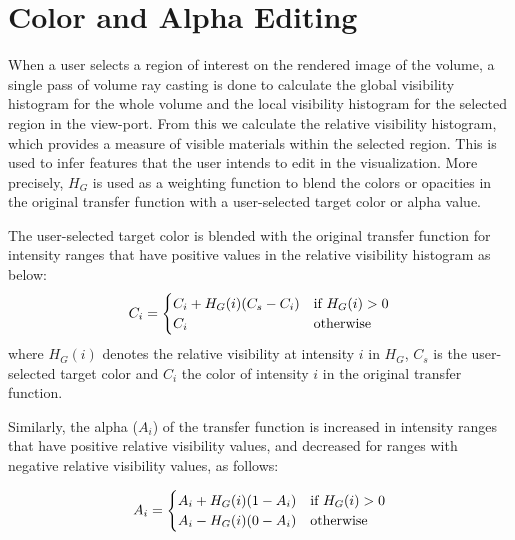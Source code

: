 \documentclass[twoside,twocolumn,10pt]{article}
\begin{document}


\section{Color and Alpha Editing} \label{color_and_alpha_editing}

When a user selects a region of interest on the rendered image of the volume, a single pass of volume ray casting is done to calculate the global visibility histogram for the whole volume and the local visibility histogram for the selected region in the view-port. From this we calculate the relative visibility histogram, which provides a measure of visible materials within the selected region. This is used to infer features that the user intends to edit in the visualization. More precisely, $H_G$ is used as a weighting function to blend the colors or opacities in the original transfer function with a user-selected target color or alpha value.

The user-selected target color is blended with the original transfer function for intensity ranges that have positive values in the relative visibility histogram as below:
\[
C_{i} =
\begin{cases}
C_{i}+H_{G}(i)(C_{s}-C_{i}) & \text{if $ H_{G}(i)>0 $} \\
C_{i} & \text{otherwise}
\end{cases}
\]
where $ H_{G}(i) $ denotes the relative visibility at intensity $ i $ in $ H_{G} $, $ C_{s} $ is the user-selected target color and $ C_{i} $ the color of intensity $ i $ in the original transfer function.

Similarly, the alpha ($A_i$) of the transfer function is increased in intensity ranges that have positive relative visibility values, and decreased for ranges with negative relative visibility values, as follows:




\[
A_{i} =
\begin{cases}
A_{i}+H_{G}(i)(1-A_{i}) & \text{if $ H_{G}(i)>0 $} \\
A_{i}-H_{G}(i)(0-A_{i}) & \text{otherwise}
\end{cases}
\]
\end{document}
